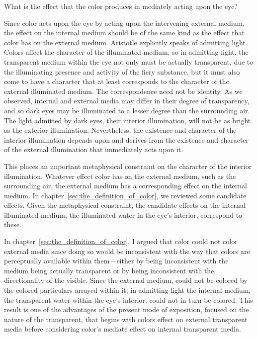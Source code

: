 What is the effect that the color produces in mediately acting upon the eye?

Since color acts upon the eye by acting upon the intervening external me\-di\-um, the effect on the internal medium should be of the same kind as the effect that color has on the external medium. Aristotle explicitly speaks of admitting light. Colors affect the character of the illuminated medium, so in admitting light, the transparent medium within the eye not only must be actually transparent, due to the illuminating presence and activity of the fiery substance, but it must also come to have a character that at least corresponds to the character of the external illuminated medium. The correspondence need not be identity. As we observed, internal and external media may differ in their degree of transparency, and so dark eyes may be illuminated to a lesser degree than the surrounding air. The light admitted by dark eyes, their interior illumination, will not be as bright as the exterior illumination. Nevertheless, the existence and character of the interior illumination depends upon and derives from the existence and character of the external illumination that immediately acts upon it.

This places an important metaphysical constraint on the character of the interior illumination. Whatever effect color has on the external medium, such as the surrounding air, the external medium has a corresponding effect on the internal medium. In chapter~\ref{sec:the_definition_of_color}, we reviewed some candidate effects. Given the metaphysical constraint, the candidate effects on the internal illuminated medium, the illuminated water in the eye's interior, correspond to these.

In chapter~\ref{sec:the_definition_of_color}, I argued that color could not color external media since doing so would be inconsistent with the way that colors are perceptually available within them---either by being inconsistent with the medium being actually transparent or by being inconsistent with the directionality of the visible. Since the external medium, could not be colored by the colored particulars arrayed within it, in admitting light the internal medium, the transparent water within the eye's interior, could not in turn be colored. This result is one of the advantages of the present mode of exposition, focused on the nature of the transparent, that begins with colors effect on external transparent media before considering color's mediate effect on internal transparent media.

